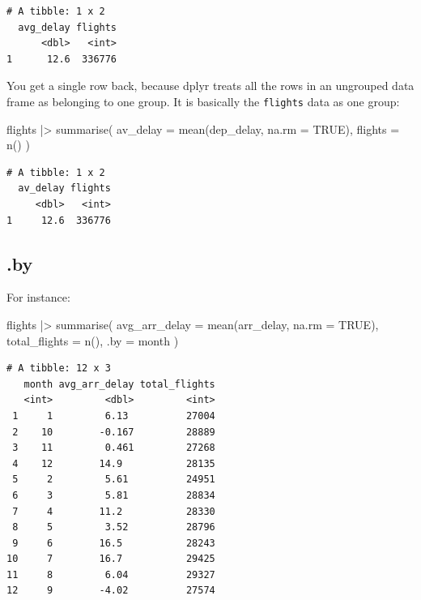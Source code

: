 \documentclass[
  letterpaper,
  DIV=11,
  numbers=noendperiod]{scrreprt}
\newenvironment{Shaded}{\begin{snugshade}}{\end{snugshade}}
\newcommand{\AttributeTok}[1]{\textcolor[rgb]{0.40,0.45,0.13}{#1}}
\newcommand{\ConstantTok}[1]{\textcolor[rgb]{0.56,0.35,0.01}{#1}}
\newcommand{\FunctionTok}[1]{\textcolor[rgb]{0.28,0.35,0.67}{#1}}
\newcommand{\NormalTok}[1]{\textcolor[rgb]{0.00,0.23,0.31}{#1}}
\newcommand{\SpecialCharTok}[1]{\textcolor[rgb]{0.37,0.37,0.37}{#1}}
\begin{document}
\begin{verbatim}
# A tibble: 1 x 2
  avg_delay flights
      <dbl>   <int>
1      12.6  336776
\end{verbatim}

You get a single row back, because dplyr treats all the rows in an
ungrouped data frame as belonging to one group. It is basically the
\texttt{flights} data as one group:

\begin{Shaded}
\begin{Highlighting}[]
\NormalTok{flights }\SpecialCharTok{|\textgreater{}}
  \FunctionTok{summarise}\NormalTok{(}
    \AttributeTok{av\_delay =} \FunctionTok{mean}\NormalTok{(dep\_delay, }\AttributeTok{na.rm =} \ConstantTok{TRUE}\NormalTok{),}
    \AttributeTok{flights =} \FunctionTok{n}\NormalTok{()}
\NormalTok{  )}
\end{Highlighting}
\end{Shaded}

\begin{verbatim}
# A tibble: 1 x 2
  av_delay flights
     <dbl>   <int>
1     12.6  336776
\end{verbatim}

\subsection{.by}\label{by}

For instance:

\begin{Shaded}
\begin{Highlighting}[]
\NormalTok{flights }\SpecialCharTok{|\textgreater{}}
  \FunctionTok{summarise}\NormalTok{(}
    \AttributeTok{avg\_arr\_delay =} \FunctionTok{mean}\NormalTok{(arr\_delay, }\AttributeTok{na.rm =} \ConstantTok{TRUE}\NormalTok{),}
    \AttributeTok{total\_flights =} \FunctionTok{n}\NormalTok{(),}
    \AttributeTok{.by =}\NormalTok{ month}
\NormalTok{  )}
\end{Highlighting}
\end{Shaded}

\begin{verbatim}
# A tibble: 12 x 3
   month avg_arr_delay total_flights
   <int>         <dbl>         <int>
 1     1         6.13          27004
 2    10        -0.167         28889
 3    11         0.461         27268
 4    12        14.9           28135
 5     2         5.61          24951
 6     3         5.81          28834
 7     4        11.2           28330
 8     5         3.52          28796
 9     6        16.5           28243
10     7        16.7           29425
11     8         6.04          29327
12     9        -4.02          27574
\end{verbatim}
\end{document}

